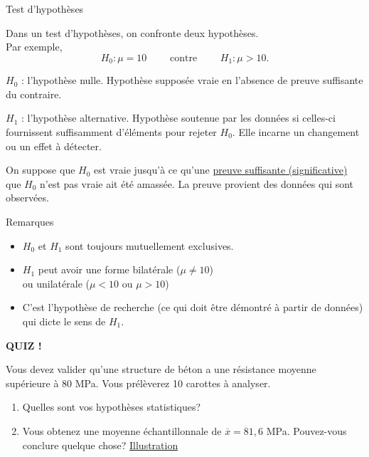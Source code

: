 \documentclass{BeamerTemplate}
\begin{document}
\begin{frame}[t]{Test d'hypothèses}

\small
Dans un \alert{test d'hypothèses}, on confronte deux hypothèses.\\ %
Par exemple,
$$H_0 : \mu = 10 \qquad \mbox{ contre } \qquad  H_1 : \mu > 10.$$

\medskip
 \alert{$H_0$ : l'hypothèse nulle}. Hypothèse supposée vraie en l’absence de preuve suffisante du contraire.

\medskip

 \alert{$H_1$ : l'hypothèse alternative}.
Hypothèse soutenue par les données si celles-ci fournissent suffisamment d’éléments pour rejeter $H_0$. Elle incarne un changement ou un effet à détecter.

\medskip

On suppose que $H_0$ est vraie jusqu'à ce qu'une \underline{preuve suffisante (significative)} que $H_0$ n'est pas vraie ait été amassée. La preuve provient des données qui sont observées.

\end{frame}


\begin{frame}[t]{Remarques}
\begin{itemize}\itemsep4mm
\item $H_0$ et $H_1$ sont toujours mutuellement exclusives.
\item $H_1$ peut avoir une forme bilatérale ($\mu\ne 10$)\\ ou unilatérale ($\mu<10$ ou $\mu>10$)
\item C'est l'hypothèse de recherche (ce qui doit être démontré à partir de données) qui dicte le sens de $H_1$.

\end{itemize}
\end{frame}

\begin{frame}[t]{ }

\centerline{\LARGE\bf \alert{QUIZ !}}
\bigskip

Vous devez valider qu'une structure de béton a une résistance moyenne supérieure à 80 MPa. Vous prélèverez 10 carottes à analyser.
\bigskip

\begin{enumerate}\itemsep 15mm
\item Quelles sont vos hypothèses statistiques?
\item Vous obtenez une moyenne échantillonnale de $\overline x = 81,6$ MPa. Pouvez-vous conclure quelque chose? \href{https://jmiron-introtest.share.connect.posit.cloud/}{Illustration}
\end{enumerate}

\vspace{1.5cm}
\end{frame}
\end{document}
